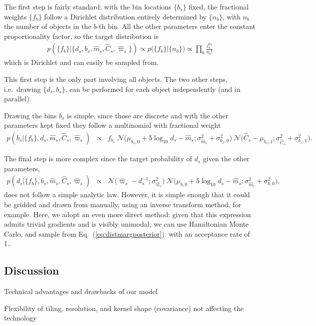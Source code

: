 \documentclass[aps,prd,showpacs,superscriptaddress,groupedaddress]{revtex4}  %
\newcommand{\ie}{{{i.e.}~}}
\newcommand{\equref}[1]{{\xspace}Eq.~(\ref{#1})}
\newcommand{\eqn}[1]{\begin{eqnarray}#1\end{eqnarray}}
\begin{document}
The first step is fairly standard: with the bin locations $\{b_s\}$ fixed, the fractional weights $\{ f_{b} \}$ follow a Dirichlet distribution entirely determined by $\{n_b \}$, with $n_b$ the number of objects in the $b$-th bin.
All the other parameters enter the constant proportionality factor, so the target distribution is
\eqn{
	p\left(\bigl\{ f_b \bigr\} \bigr\rvert \bigl\{ d_s, b_s, \hat{m}_s, \hat{C}_s, \hat{\varpi}_s \bigr\} \right) \propto p\bigl( \bigl\{ f_b \bigr\} \bigr\rvert \{n_b \} \bigr) \propto \prod_b \frac{ f_b^{n_b} }{n_b !}
}
which is Dirichlet and can easily be sampled from.

This first step is the only part involving all objects. The two other steps, \ie drawing $\{d_s, b_s\}$, can be performed for each object independently (and in parallel).

Drawing the bins $b_s$ is simple, since those are discrete and with the other parameters kept fixed they follow a multinomial with fractional weight
\eqn{
	p\left(b_s \bigr\rvert \bigl\{ f_b \bigr\}, d_s, \hat{m}_s, \hat{C}_s, \hat{\varpi}_s\right) &\propto& f_{b_s} \  \mathcal{N}\bigl( \mu_{b_s,0} + 5\log_{10}d_s  -\hat{m}_s ;\sigma_{\hat{m}_s}^2 + \sigma_{b_s,0}^2 \bigr) \  \mathcal{N}\bigl(\hat{C}_s - \mu_{b_s,1};\sigma_{\hat{C}_s}^2 + \sigma_{b_s,1}^2 \bigr).
}

The final step is more complex since the target probability of $d_s$ given the other parameters,
\eqn{
	p\left(d_s \bigr\rvert \bigl\{ f_b \bigr\}, b_s, \hat{m}_s, \hat{C}_s, \hat{\varpi}_s\right) &\propto&  \mathcal{N}\bigl(\hat{\varpi}_s - d_s^{-1};\sigma_{\hat{\varpi}_s}^2 \bigr) \  \mathcal{N}\bigl( \mu_{b,0} + 5\log_{10}d_s  -\hat{m}_s ;\sigma_{\hat{m}_s}^2 + \sigma_{b,0}^2 \bigr) ,\label{eq:distmargposterior}
}
does not follow a simple analytic law.
However, it is simple enough that it could be gridded and drawn from manually, using an inverse transform method, for example.
Here, we adopt an even more direct method: given that this expression admits trivial gradients and is visibly unimodal, we can use Hamiltonian Monte Carlo, and sample from \equref{eq:distmargposterior}. 
with an acceptance rate of 1..


\subsection{Discussion}

Technical advantages and drawbacks of our model

Flexibility of tiling, resolution, and kernel shape (covariance) not affecting the technology
\end{document}
